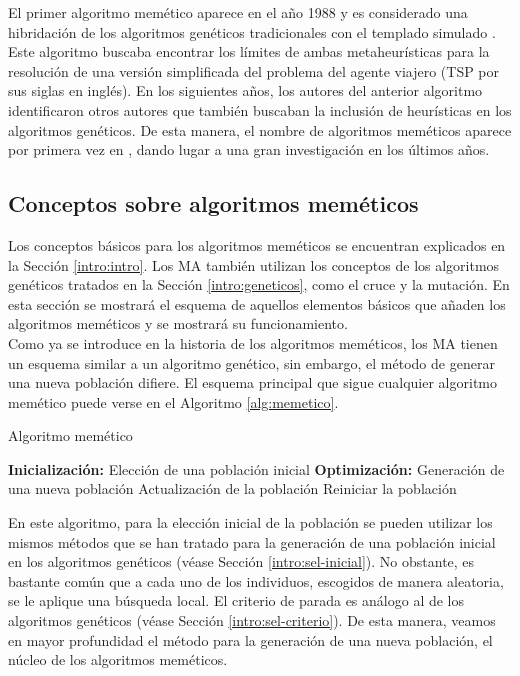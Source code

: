 El primer algoritmo memético aparece en el año 1988 y es considerado una hibridación de los algoritmos genéticos tradicionales con el templado simulado \cite{firstma}. Este algoritmo buscaba encontrar los límites de ambas metaheurísticas para la resolución de una versión simplificada del problema del agente viajero (TSP por sus siglas en inglés). En los siguientes años, los autores del anterior algoritmo identificaron otros autores que también buscaban la inclusión de heurísticas en los algoritmos genéticos. De esta manera, el nombre de algoritmos meméticos aparece por primera vez en \cite{memetic-name}, dando lugar a una gran investigación en los últimos años. 
\subsection{Conceptos sobre algoritmos meméticos}
Los conceptos básicos para los algoritmos meméticos se encuentran explicados en la Sección \ref{intro:intro}. Los MA también utilizan los conceptos de los algoritmos genéticos tratados en la Sección \ref{intro:geneticos}, como el cruce y la mutación. En esta sección se mostrará el esquema de aquellos elementos básicos que añaden los algoritmos meméticos y se mostrará su funcionamiento.\\

Como ya se introduce en la historia de los algoritmos meméticos, los MA tienen un esquema similar a un algoritmo genético, sin embargo, el método de generar una nueva población difiere. El esquema principal que sigue cualquier algoritmo memético puede verse en el Algoritmo \ref{alg:memetico}.\\

\begin{algorithm}[!htb]
    \caption{Algoritmo memético}
    \label{alg:memetico}
    \begin{algorithmic}[1]
        \State \textbf{Inicialización:}
        \State Elección de una población inicial
        \State \textbf{Optimización:}
            \State Generación de una nueva población
            \State Actualización de la población
            \State Reiniciar la población
            \EndIf
        \EndWhile
    \end{algorithmic}
\end{algorithm}

En este algoritmo, para la elección inicial de la población se pueden utilizar los mismos métodos que se han tratado para la generación de una población inicial en los algoritmos genéticos (véase Sección \ref{intro:sel-inicial}). No obstante, es bastante común que a cada uno de los individuos, escogidos de manera aleatoria, se le aplique una búsqueda local. El criterio de parada es análogo al de los algoritmos genéticos (véase Sección \ref{intro:sel-criterio}). De esta manera, veamos en mayor profundidad el método para la generación de una nueva población, el núcleo de los algoritmos meméticos.\\

